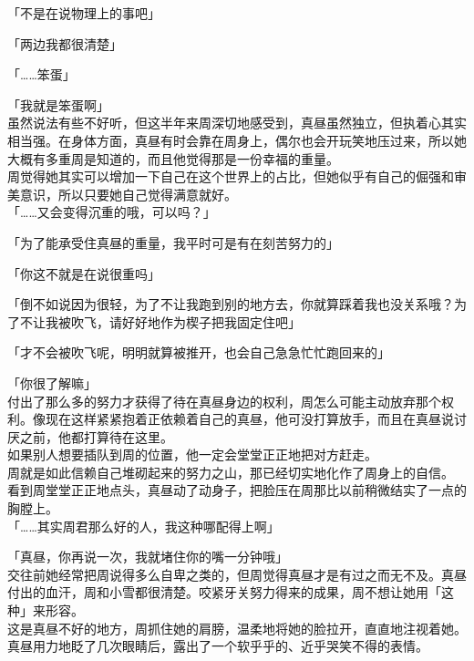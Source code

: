 「不是在说物理上的事吧」

「两边我都很清楚」

「……笨蛋」

「我就是笨蛋啊」\\

虽然说法有些不好听，但这半年来周深切地感受到，真昼虽然独立，但执着心其实相当强。在身体方面，真昼有时会靠在周身上，偶尔也会开玩笑地压过来，所以她大概有多重周是知道的，而且他觉得那是一份幸福的重量。\\

周觉得她其实可以增加一下自己在这个世界上的占比，但她似乎有自己的倔强和审美意识，所以只要她自己觉得满意就好。\\

「……又会变得沉重的哦，可以吗？」

「为了能承受住真昼的重量，我平时可是有在刻苦努力的」

「你这不就是在说很重吗」

「倒不如说因为很轻，为了不让我跑到别的地方去，你就算踩着我也没关系哦？为了不让我被吹飞，请好好地作为楔子把我固定住吧」

「才不会被吹飞呢，明明就算被推开，也会自己急急忙忙跑回来的」

「你很了解嘛」\\

付出了那么多的努力才获得了待在真昼身边的权利，周怎么可能主动放弃那个权利。像现在这样紧紧抱着正依赖着自己的真昼，他可没打算放手，而且在真昼说讨厌之前，他都打算待在这里。\\

如果别人想要插队到周的位置，他一定会堂堂正正地把对方赶走。\\

周就是如此信赖自己堆砌起来的努力之山，那已经切实地化作了周身上的自信。\\

看到周堂堂正正地点头，真昼动了动身子，把脸压在周那比以前稍微结实了一点的胸膛上。\\

「……其实周君那么好的人，我这种哪配得上啊」

「真昼，你再说一次，我就堵住你的嘴一分钟哦」\\

交往前她经常把周说得多么自卑之类的，但周觉得真昼才是有过之而无不及。真昼付出的血汗，周和小雪都很清楚。咬紧牙关努力得来的成果，周不想让她用「这种」来形容。\\

这是真昼不好的地方，周抓住她的肩膀，温柔地将她的脸拉开，直直地注视着她。真昼用力地眨了几次眼睛后，露出了一个软乎乎的、近乎哭笑不得的表情。\\

